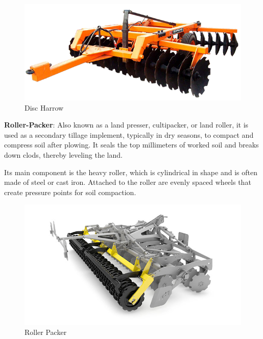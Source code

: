 \documentclass{article}
\begin{document}
\begin{flushleft}
\FloatBarrier
\begin{center}
    \begin{figure}[htbp!]
        \centering
    \includegraphics[scale=0.025]{cultivating_tool/disc_harrow.png}
    \caption{Disc Harrow}
    \end{figure}
    \end{center}
    \FloatBarrier

\textbf{Roller-Packer}: Also known as a land presser, cultipacker, or land roller, it is used as a secondary tillage implement, typically in dry seasons, to compact and compress soil after plowing. 
It seals the top millimeters of worked soil and breaks down clods, thereby leveling the land. \newline

Its main component is the heavy roller, which is cylindrical in shape and is often made of steel or cast iron. Attached to the roller are evenly spaced wheels that create pressure points for soil compaction.
\newline
\FloatBarrier
\begin{center}
    \begin{figure}[htbp!]
        \centering
    \includegraphics[scale=0.35]{cultivating_tool/roller-packer.jpg }
    \caption{Roller Packer}
    \end{figure}
    \end{center}
\FloatBarrier


\end{flushleft}
\end{document}
